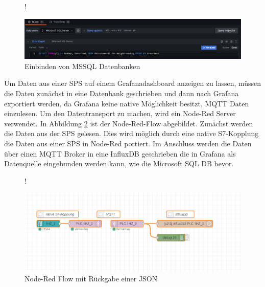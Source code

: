 \documentclass[a4paper, 12pt, oneside]{scrbook}
\begin{document}
	 \begin{figure} [H]
	 	\centering
	 	\resizebox{\linewidth} {!} {
	 		\includegraphics{res/mssql_einbinden.png}
	 		
	 	}
	 	\caption{Einbinden von MSSQL Datenbanken}
	 	\label{fig:mssql_ein}
	 \end{figure}
 	
 		\noindent Um Daten aus einer SPS auf einem Grafanadashboard anzeigen zu lassen, müssen die Daten zunächst in eine Datenbank geschrieben und dann nach Grafana exportiert werden, da Grafana keine native Möglichkeit besitzt, MQTT Daten einzulesen. Um den Datentransport zu machen, wird ein Node-Red Server verwendet. In Abbildung \ref{fig:nodered} ist der Node-Red-Flow abgebildet. Zunächst werden die Daten aus der SPS gelesen. Dies wird möglich durch eine native S7-Kopplung die Daten aus einer SPS in Node-Red portiert. Im Anschluss werden die Daten über einen MQTT Broker in eine InfluxDB geschrieben die in Grafana als Datenquelle eingebunden werden kann, wie die Microsoft SQL DB bevor.
 		
 		\begin{figure} [H]
 			\centering
 			\resizebox{\linewidth} {!} {
 				\includegraphics{res/nodered.png}
 				
 			}
 			\caption{Node-Red Flow mit Rückgabe einer JSON}
 			\label{fig:nodered}
 		\end{figure}
 	
	 	
\end{document}
